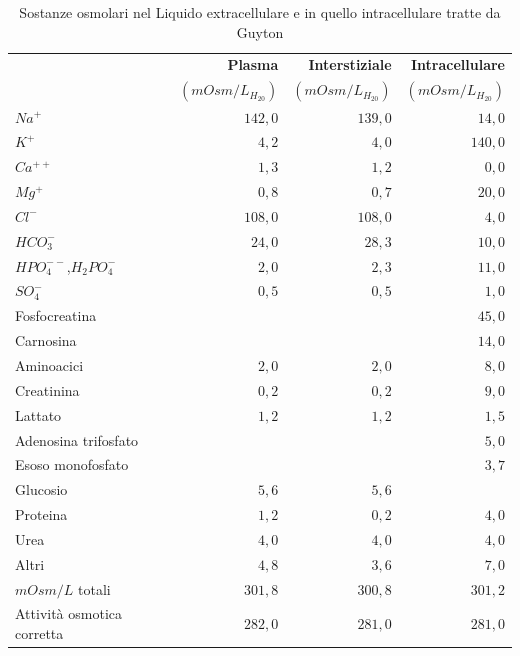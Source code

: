 \begin{table}[htb]
	\centering
	\caption{Sostanze osmolari nel Liquido extracellulare e in quello intracellulare tratte da Guyton}
	\begin{tabular}{lrrr}
	\toprule 
		& \textbf{Plasma}        & \textbf{Interstiziale} & \textbf{Intracellulare}       \\
  	& $(mOsm/L_{H_20})$ & $(mOsm/L_{H_20})$ & $(mOsm/L_{H_20})$ \\
  \midrule
  	$Na^+$                     &  $142,0$  &  $139,0$  &  $14,0$  \\
  	$K^+$                      &  $4,2$    &  $4,0$    &  $140,0$ \\
  	$Ca^{++}$                  &  $1,3$    &  $1,2$    &  $0,0$   \\
  	$Mg^+$                     &  $0,8$    &  $0,7$    &  $20,0$  \\
  	$Cl^-$                     &  $108,0$  &  $108,0$  &  $4,0$   \\
  	$HCO_3^-$                  &  $24,0$   &  $28,3$   &  $10,0$  \\
  	$HPO_4^{--}$,$H_2PO_4^-$   &  $2,0$    &  $2,3$    &  $11,0$  \\
  	$SO_4^-$                   &  $0,5$    &  $0,5$    &  $1,0$   \\
  	Fosfocreatina              &           &           &  $45,0$  \\
  	Carnosina                  &           &           &  $14,0$  \\
  	Aminoacici                 &  $2,0$    &  $2,0$    &  $8,0$   \\
  	Creatinina                 &  $0,2$    &  $0,2$    &  $9,0$   \\
  	Lattato                    &  $1,2$    &  $1,2$    &  $1,5$   \\
  	Adenosina trifosfato       &           &           &  $5,0$   \\
  	Esoso monofosfato          &           &           &  $3,7$   \\
  	Glucosio                   &  $5,6$    &  $5,6$    &          \\
  	Proteina                   &  $1,2$    &  $0,2$    &  $4,0$   \\
  	Urea                       &  $4,0$    &  $4,0$    &  $4,0$   \\
  	Altri                      &  $4,8$    &  $3,6$    &  $7,0$  \\
  	$mOsm/L$ totali            &  $301,8$  &  $300,8$  &  $301,2$ \\
  \midrule
  	Attività osmotica corretta &  $282,0$  &  $281,0$  &  $281,0$   \\
  \bottomrule
\end{tabular}\label{tab:Osm}
\end{table}

